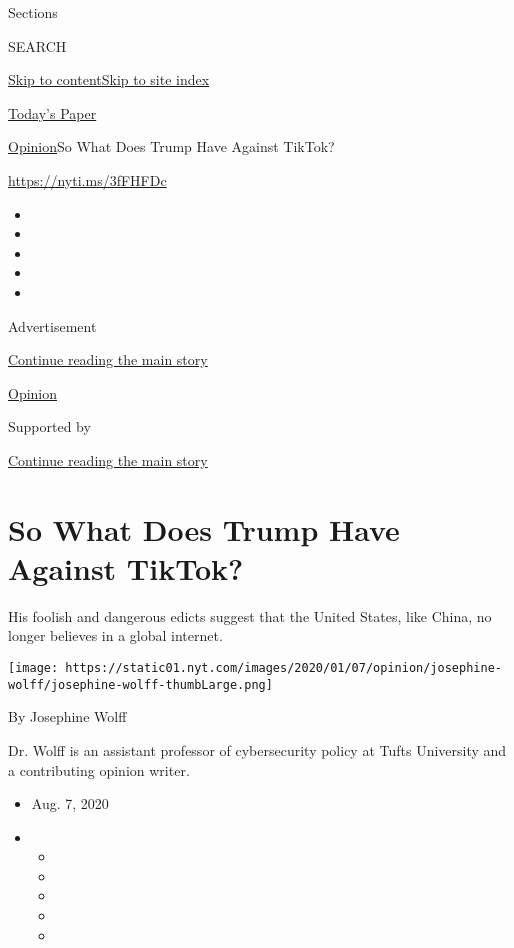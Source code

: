 Sections

SEARCH

\protect\hyperlink{site-content}{Skip to
content}\protect\hyperlink{site-index}{Skip to site index}

\href{https://myaccount.nytimes.com/auth/login?response_type=cookie\&client_id=vi}{}

\href{https://www.nytimes.com/section/todayspaper}{Today's Paper}

\href{/section/opinion}{Opinion}\textbar{}So What Does Trump Have
Against TikTok?

\href{https://nyti.ms/3fFHFDc}{https://nyti.ms/3fFHFDc}

\begin{itemize}
\item
\item
\item
\item
\item
\end{itemize}

Advertisement

\protect\hyperlink{after-top}{Continue reading the main story}

\href{/section/opinion}{Opinion}

Supported by

\protect\hyperlink{after-sponsor}{Continue reading the main story}

\hypertarget{so-what-does-trump-have-against-tiktok}{%
\section{So What Does Trump Have Against
TikTok?}\label{so-what-does-trump-have-against-tiktok}}

His foolish and dangerous edicts suggest that the United States, like
China, no longer believes in a global internet.

\texttt{[image: https://static01.nyt.com/images/2020/01/07/opinion/josephine-wolff/josephine-wolff-thumbLarge.png]}

By Josephine Wolff

Dr. Wolff is an assistant professor of cybersecurity policy at Tufts
University and a contributing opinion writer.

\begin{itemize}
\item
  Aug. 7, 2020
\item
  \begin{itemize}
  \item
  \item
  \item
  \item
  \item
  \end{itemize}
\end{itemize}

